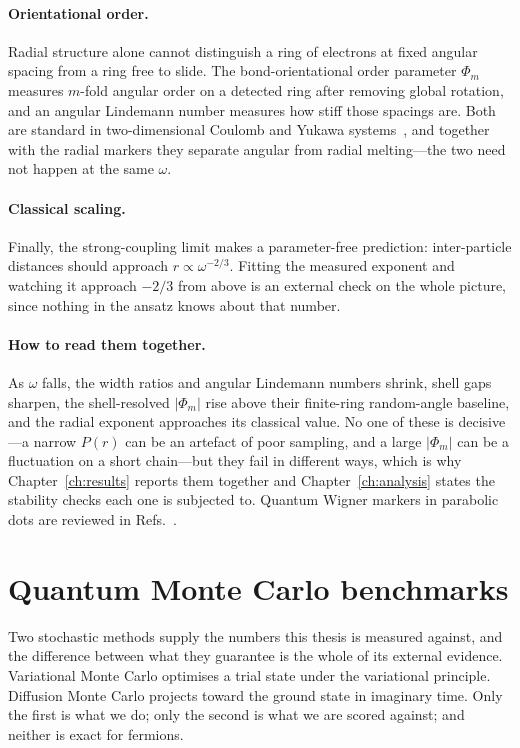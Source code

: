 \paragraph{Orientational order.} Radial structure alone cannot distinguish a ring of
electrons at fixed angular spacing from a ring free to slide. The bond-orientational order
parameter $\Phi_m$ measures $m$-fold angular order on a detected ring after removing global
rotation, and an angular Lindemann number measures how stiff those spacings are. Both are
standard in two-dimensional Coulomb and Yukawa
systems~\cite{Mazars_2008,Filinov_2001}, and together with the radial markers they separate
angular from radial melting---the two need not happen at the same $\omega$.

\paragraph{Classical scaling.} Finally, the strong-coupling limit makes a parameter-free
prediction: inter-particle distances should approach $r\propto\omega^{-2/3}$. Fitting the
measured exponent and watching it approach $-2/3$ from above is an external check on the
whole picture, since nothing in the ansatz knows about that number.

\paragraph{How to read them together.} As $\omega$ falls, the width ratios and angular
Lindemann numbers shrink, shell gaps sharpen, the shell-resolved $|\Phi_m|$ rise above their
finite-ring random-angle baseline, and the radial exponent approaches its classical value. No one of
these is decisive---a narrow $P(r)$ can be an artefact of poor sampling, and a large
$|\Phi_m|$ can be a fluctuation on a short chain---but they fail in different ways, which is
why Chapter~\ref{ch:results} reports them together and Chapter~\ref{ch:analysis} states the
stability checks each one is subjected to. Quantum Wigner markers in parabolic dots are
reviewed in Refs.~\cite{Egger_1999,manninen2007metalclustersquantumdots,Filinov_2001,Mazars_2008}.

\section{Quantum Monte Carlo benchmarks}
\label{sec:qmc-theory}

Two stochastic methods supply the numbers this thesis is measured against, and the
difference between what they guarantee is the whole of its external evidence. Variational
Monte Carlo optimises a trial state under the variational principle. Diffusion Monte Carlo
projects toward the ground state in imaginary time. Only the first is what we do; only the
second is what we are scored against; and neither is exact for fermions.

